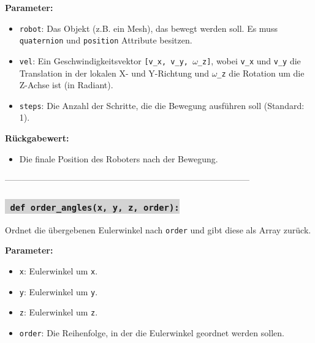 \noindent \textbf{Parameter:} \vspace{-6ex} \\
\begin{itemize}
    \setlength{\itemindent}{1em}
    \item \texttt{robot}: Das Objekt (z.B. ein Mesh), das bewegt werden soll. Es muss \texttt{quaternion} und \texttt{position} Attribute besitzen.
    \item \texttt{vel}: Ein Geschwindigkeitsvektor \texttt{[v\_x, v\_y, $\omega$\_z]}, wobei \texttt{v\_x} und \texttt{v\_y} die Translation in der lokalen X- und Y-Richtung und \texttt{$\omega$\_z} die Rotation um die Z-Achse ist (in Radiant).
    \item \texttt{steps}: Die Anzahl der Schritte, die die Bewegung ausführen soll (Standard: 1).
\end{itemize}

\noindent \textbf{Rückgabewert:} \vspace{-6ex} \\
\begin{itemize}
    \setlength{\itemindent}{1em}
    \item Die finale Position des Roboters nach der Bewegung.
\end{itemize}

--------------------------------------------------------------------------------------


\subsubsection*{\colorbox{lightgray}{\texttt{\textbf{\color{green} def} \color{blue} order\_angles}\textbf{\texttt{(x, y, z, order):}}}}
Ordnet die übergebenen Eulerwinkel nach \texttt{order} und gibt diese als Array zurück.

\noindent \textbf{Parameter:} \vspace{-6ex} \\
\begin{itemize}
    \setlength{\itemindent}{1em}
    \item \texttt{x}: Eulerwinkel um \texttt{x}.
    \item \texttt{y}: Eulerwinkel um \texttt{y}.
    \item \texttt{z}: Eulerwinkel um \texttt{z}.
    \item \texttt{order}: Die Reihenfolge, in der die Eulerwinkel geordnet werden sollen.
\end{itemize}

